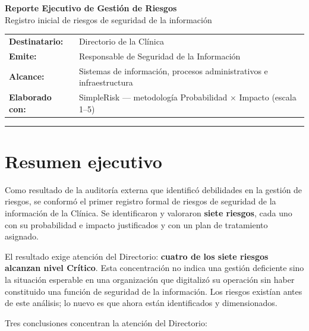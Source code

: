 \documentclass[10pt,a4paper]{article}
\begin{document}
\begin{center}
{\LARGE\bfseries Reporte Ejecutivo de Gestión de Riesgos}\\[6pt]
{\large Registro inicial de riesgos de seguridad de la información}\\[10pt]
\end{center}

\begin{tabular}{@{}ll@{}}
\textbf{Destinatario:} & Directorio de la Clínica \\
\textbf{Emite:} & Responsable de Seguridad de la Información \\
\textbf{Alcance:} & Sistemas de información, procesos administrativos e infraestructura \\
\textbf{Elaborado con:} & SimpleRisk --- metodología Probabilidad $\times$ Impacto (escala 1--5) \\
\end{tabular}

\vspace{6pt}
\hrule
\vspace{10pt}

\section{Resumen ejecutivo}

Como resultado de la auditoría externa que identificó debilidades en la gestión
de riesgos, se conformó el primer registro formal de riesgos de seguridad de la
información de la Clínica. Se identificaron y valoraron \textbf{siete riesgos},
cada uno con su probabilidad e impacto justificados y con un plan de tratamiento
asignado.

El resultado exige atención del Directorio: \textbf{cuatro de los siete riesgos
alcanzan nivel Crítico}. Esta concentración no indica una gestión deficiente sino
la situación esperable en una organización que digitalizó su operación sin haber
constituido una función de seguridad de la información. Los riesgos existían
antes de este análisis; lo nuevo es que ahora están identificados y dimensionados.

Tres conclusiones concentran la atención del Directorio:
\end{document}
